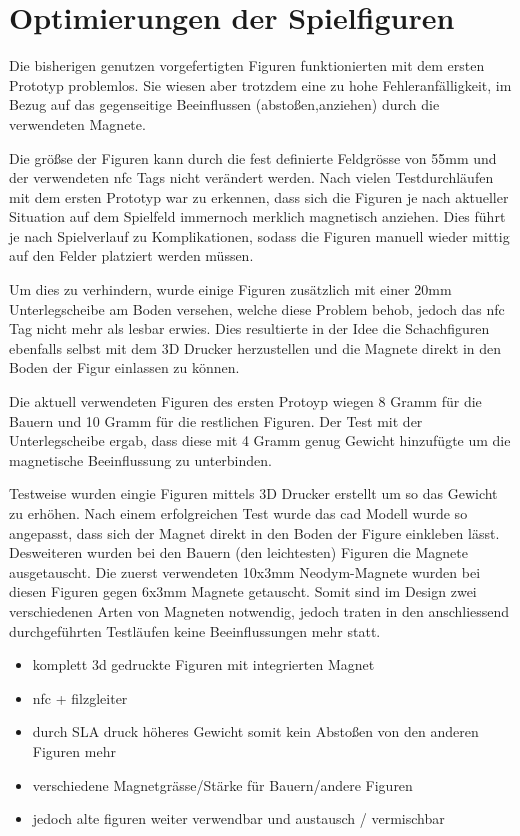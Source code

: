 \hypertarget{optimierungen-der-spielfiguren}{%
\section{Optimierungen der
Spielfiguren}\label{optimierungen-der-spielfiguren}}

Die bisherigen genutzen vorgefertigten Figuren funktionierten mit dem
ersten Prototyp problemlos. Sie wiesen aber trotzdem eine zu hohe
Fehleranfälligkeit, im Bezug auf das gegenseitige Beeinflussen
(abstoßen,anziehen) durch die verwendeten Magnete.

Die größse der Figuren kann durch die fest definierte Feldgrösse von
55mm und der verwendeten \gls{nfc} Tags nicht verändert werden. Nach
vielen Testdurchläufen mit dem ersten Prototyp war zu erkennen, dass
sich die Figuren je nach aktueller Situation auf dem Spielfeld immernoch
merklich magnetisch anziehen. Dies führt je nach Spielverlauf zu
Komplikationen, sodass die Figuren manuell wieder mittig auf den Felder
platziert werden müssen.

Um dies zu verhindern, wurde einige Figuren zusätzlich mit einer 20mm
Unterlegscheibe am Boden versehen, welche diese Problem behob, jedoch
das \gls{nfc} Tag nicht mehr als lesbar erwies. Dies resultierte in der
Idee die Schachfiguren ebenfalls selbst mit dem 3D Drucker herzustellen
und die Magnete direkt in den Boden der Figur einlassen zu können.

Die aktuell verwendeten Figuren des ersten Protoyp wiegen 8 Gramm für
die Bauern und 10 Gramm für die restlichen Figuren. Der Test mit der
Unterlegscheibe ergab, dass diese mit 4 Gramm genug Gewicht hinzufügte
um die magnetische Beeinflussung zu unterbinden.

Testweise wurden eingie Figuren mittels 3D Drucker erstellt um so das
Gewicht zu erhöhen. Nach einem erfolgreichen Test wurde das \gls{cad}
Modell wurde so angepasst, dass sich der Magnet direkt in den Boden der
Figure einkleben lässt. Desweiteren wurden bei den Bauern (den
leichtesten) Figuren die Magnete ausgetauscht. Die zuerst verwendeten
10x3mm Neodym-Magnete wurden bei diesen Figuren gegen 6x3mm Magnete
getauscht. Somit sind im Design zwei verschiedenen Arten von Magneten
notwendig, jedoch traten in den anschliessend durchgeführten Testläufen
keine Beeinflussungen mehr statt.

\begin{itemize}
\item
  komplett 3d gedruckte Figuren mit integrierten Magnet
\item
  nfc + filzgleiter
\item
  durch SLA druck höheres Gewicht somit kein Abstoßen von den anderen
  Figuren mehr
\item
  verschiedene Magnetgrässe/Stärke für Bauern/andere Figuren
\item
  jedoch alte figuren weiter verwendbar und austausch / vermischbar
\end{itemize}

